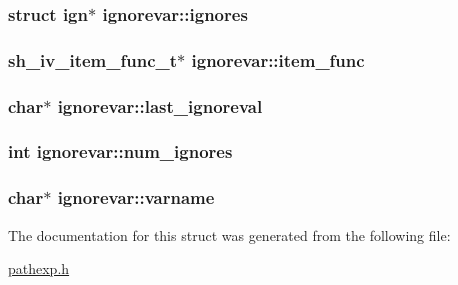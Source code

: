 \subsubsection[{\texorpdfstring{ignores}{ignores}}]{\setlength{\rightskip}{0pt plus 5cm}struct {\bf ign}$\ast$ ignorevar\+::ignores}\hypertarget{structignorevar_a4df6df8420b250d65d0fc25f30f60adc}{}\label{structignorevar_a4df6df8420b250d65d0fc25f30f60adc}
\subsubsection[{\texorpdfstring{item\+\_\+func}{item_func}}]{\setlength{\rightskip}{0pt plus 5cm}sh\+\_\+iv\+\_\+item\+\_\+func\+\_\+t$\ast$ ignorevar\+::item\+\_\+func}\hypertarget{structignorevar_ade27d1004f266495c1229b154f24e1cf}{}\label{structignorevar_ade27d1004f266495c1229b154f24e1cf}
\subsubsection[{\texorpdfstring{last\+\_\+ignoreval}{last_ignoreval}}]{\setlength{\rightskip}{0pt plus 5cm}char$\ast$ ignorevar\+::last\+\_\+ignoreval}\hypertarget{structignorevar_a579abbc7ef7ac4a590ae52545bd8b43f}{}\label{structignorevar_a579abbc7ef7ac4a590ae52545bd8b43f}
\subsubsection[{\texorpdfstring{num\+\_\+ignores}{num_ignores}}]{\setlength{\rightskip}{0pt plus 5cm}int ignorevar\+::num\+\_\+ignores}\hypertarget{structignorevar_a95a5f4f22d35923944fb9b4c8f0ba209}{}\label{structignorevar_a95a5f4f22d35923944fb9b4c8f0ba209}
\subsubsection[{\texorpdfstring{varname}{varname}}]{\setlength{\rightskip}{0pt plus 5cm}char$\ast$ ignorevar\+::varname}\hypertarget{structignorevar_ab13e47d0a13f6a8664a45472d22fb4c3}{}\label{structignorevar_ab13e47d0a13f6a8664a45472d22fb4c3}


The documentation for this struct was generated from the following file\+:\begin{DoxyCompactItemize}
\item 
\hyperlink{pathexp_8h}{pathexp.\+h}\end{DoxyCompactItemize}

